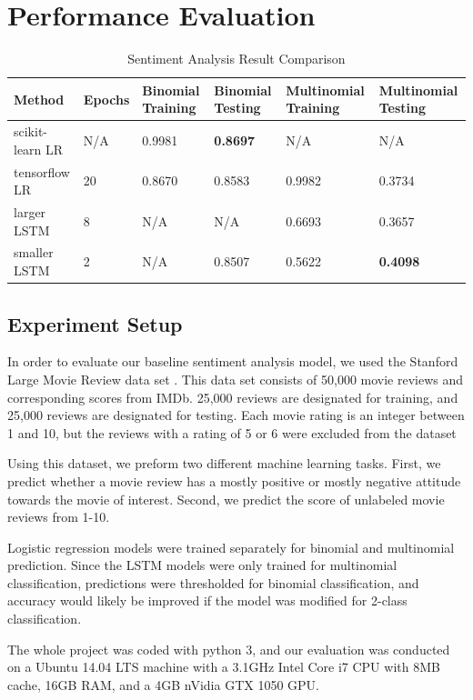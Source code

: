 \documentclass[conference]{IEEEtran}
\begin{document}
\section{Performance Evaluation}
\label{performance}
    \begin{table}[]
        \centering
        \caption{Sentiment Analysis Result Comparison}
        \label{my-label}
        \begin{tabularx}{\textwidth}{ X X X  X X  X }
        \toprule
        Method & Epochs & Binomial Training & Binomial Testing & Multinomial Training & Multinomial Testing \\
        \midrule
        scikit-learn LR & N/A & 0.9981 & \textbf{0.8697} & N/A & N/A \\
        tensorflow LR & 20 &  0.8670 & 0.8583 & 0.9982 & 0.3734 \\
        larger LSTM & 8 & N/A & N/A & 0.6693 & 0.3657 \\
        smaller LSTM  & 2 & N/A    & 0.8507 & 0.5622   & \textbf{0.4098} \\
        \bottomrule
        \end{tabularx}
    \end{table}
\subsection{Experiment Setup}
    In order to evaluate our baseline sentiment analysis model, we used the
    Stanford Large Movie Review data set \cite{maas2011learning}. This data
    set consists of 50,000 movie reviews and corresponding scores from IMDb.
    25,000 reviews are designated for training, and 25,000 reviews are designated for testing.
    Each movie rating is an integer between 1 and 10, but the reviews with a rating
    of 5 or 6 were excluded from the dataset

    Using this dataset, we preform
    two different machine learning tasks. First, we predict whether a movie review
    has a mostly positive or mostly negative attitude towards the movie of interest.
    Second, we predict the score of unlabeled movie reviews from 1-10.

    Logistic regression models were trained separately for binomial and multinomial
    prediction. Since the LSTM models were  only trained
    for multinomial classification, predictions were thresholded for binomial
    classification, and accuracy would likely be improved if the model was modified
    for 2-class classification.

    The whole project was coded with python 3, and our evaluation was conducted on
    a Ubuntu 14.04 LTS machine with a 3.1GHz Intel Core i7 CPU with 8MB cache,
    16GB RAM, and a 4GB nVidia GTX 1050 GPU.
\end{document}
